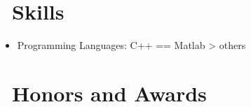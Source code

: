 \documentclass{resume}
\begin{document}
\section{\faCogs\ Skills}
\begin{itemize}[parsep=0.5ex]
  \item Programming Languages: C++ == Matlab > others
\end{itemize}
   
\section{\faHeartO\ Honors and Awards}

%
%
\end{document}
